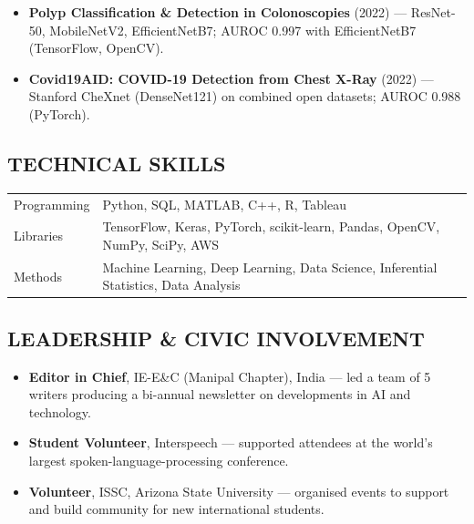 \documentclass[a4paper, 11pt]{article}
\begin{document}
{\begin{itemize}[nosep]
  \item \textbf{Polyp Classification \& Detection in Colonoscopies} (2022) --- ResNet-50, MobileNetV2, EfficientNetB7; AUROC 0.997 with EfficientNetB7 (TensorFlow, OpenCV).
  \item \textbf{Covid19AID: COVID-19 Detection from Chest X-Ray} (2022) --- Stanford CheXnet (DenseNet121) on combined open datasets; AUROC 0.988 (PyTorch).
\end{itemize}

\smallskip

\subsection{TECHNICAL SKILLS}
\vspace{2pt}

\noindent
\begin{tabularx}{\textwidth}{@{}lX@{}}
Programming & Python, SQL, MATLAB, C++, R, Tableau \\[2pt]
Libraries   & TensorFlow, Keras, PyTorch, scikit-learn, Pandas, OpenCV, NumPy, SciPy, AWS \\[2pt]
Methods     & Machine Learning, Deep Learning, Data Science, Inferential Statistics, Data Analysis \\
\end{tabularx}

\smallskip

\subsection{LEADERSHIP \& CIVIC INVOLVEMENT}
\vspace{2pt}

\begin{itemize}[nosep]
  \item \textbf{Editor in Chief}, IE-E\&C (Manipal Chapter), India --- led a team of 5 writers producing a bi-annual newsletter on developments in AI and technology.
  \item \textbf{Student Volunteer}, Interspeech --- supported attendees at the world's largest spoken-language-processing conference.
  \item \textbf{Volunteer}, ISSC, Arizona State University --- organised events to support and build community for new international students.
\end{itemize}

} %
\end{document}
